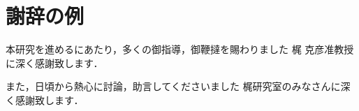 \chapter*{謝辞の例}

本研究を進めるにあたり，多くの御指導，御鞭撻を賜わりました
梶 克彦准教授に深く感謝致します．

また，日頃から熱心に討論，助言してくださいました
梶研究室のみなさんに深く感謝致します．






